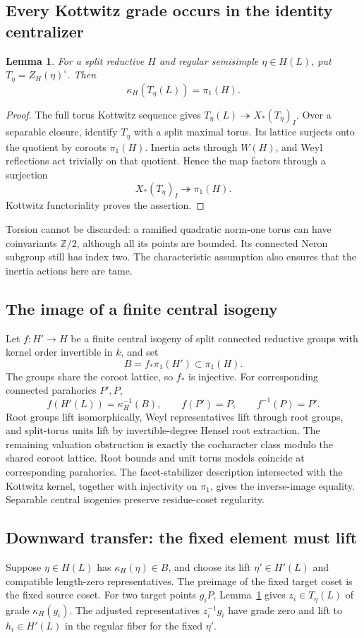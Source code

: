 \documentclass[11pt,a4paper]{article}
\newtheorem{lemma}[theorem]{Lemma}
\theoremstyle{definition}
\theoremstyle{remark}
\begin{document}
\subsection{Every Kottwitz grade occurs in the identity centralizer}
\begin{lemma}\label{lem:torus-grades}
For a split reductive \(H\) and regular semisimple \(\eta\in H(L)\),
put \(T_\eta=Z_H(\eta)^\circ\). Then
\[
\kappa_H(T_\eta(L))=\pi_1(H).
\]
\end{lemma}
\begin{proof}
The full torus Kottwitz sequence gives
\(T_\eta(L)\twoheadrightarrow X_*(T_\eta)_I\).
Over a separable closure, identify \(T_\eta\) with a split maximal
torus. Its lattice surjects onto the quotient by coroots
\(\pi_1(H)\). Inertia acts through \(W(H)\), and Weyl reflections
act trivially on that quotient. Hence the map factors through a
surjection
\[
X_*(T_\eta)_I\twoheadrightarrow\pi_1(H).
\]
Kottwitz functoriality proves the assertion.
\end{proof}
Torsion cannot be discarded: a ramified quadratic norm-one torus can
have coinvariants \(\mathbb Z/2\), although all its points are bounded.
Its connected Neron subgroup still has index two. The characteristic
assumption also ensures that the inertia actions here are tame.

\subsection{The image of a finite central isogeny}
Let \(f:H'\to H\) be a finite central isogeny of split connected
reductive groups with kernel order invertible in \(k\), and set
\[
B=f_*\pi_1(H')\subset\pi_1(H).
\]
The groups share the coroot lattice, so \(f_*\) is injective.
For corresponding connected parahorics \(P',P\),
\[
f(H'(L))=\kappa_H^{-1}(B),\qquad
f(P')=P,\qquad f^{-1}(P)=P'.
\]
Root groups lift isomorphically, Weyl representatives lift through
root groups, and split-torus units lift by invertible-degree Hensel
root extraction. The remaining valuation obstruction is exactly
the cocharacter class modulo the shared coroot lattice. Root bounds
and unit torus models coincide at corresponding parahorics. The
facet-stabilizer description intersected with the Kottwitz kernel,
together with injectivity on \(\pi_1\), gives the inverse-image
equality. Separable central isogenies preserve residue-coset regularity.

\subsection{Downward transfer: the fixed element must lift}
Suppose \(\eta\in H(L)\) has \(\kappa_H(\eta)\in B\), and choose
its lift \(\eta'\in H'(L)\) and compatible length-zero representatives.
The preimage of the fixed target coset is the fixed source coset.
For two target points \(g_iP\), Lemma~\ref{lem:torus-grades} gives
\(z_i\in T_\eta(L)\) of grade \(\kappa_H(g_i)\).
The adjusted representatives \(z_i^{-1}g_i\) have grade zero and lift
to \(h_i\in H'(L)\) in the regular fiber for the fixed \(\eta'\).
\end{document}
